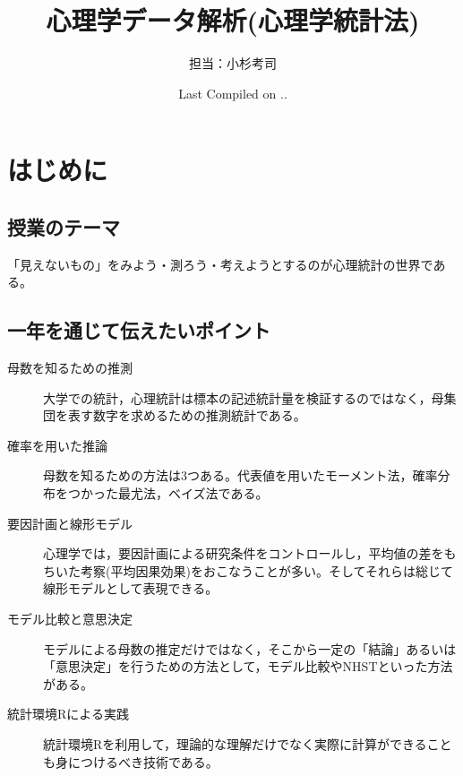 \documentclass[dvipsnames]{ltjsarticle}
\begin{document}
\title{心理学データ解析(心理学統計法)}
\author{担当：小杉考司}
\date{Last Compiled on \number\year .\number\month .\number\day}
\maketitle

\setcounter{tocdepth}{1}
\newpage
\section*{はじめに}
\subsection*{授業のテーマ}

「見えないもの」をみよう・測ろう・考えようとするのが心理統計の世界である。

\subsection*{一年を通じて伝えたいポイント}
\begin{description}
	\item[母数を知るための推測] 大学での統計，心理統計は標本の記述統計量を検証するのではなく，母集団を表す数字を求めるための推測統計である。
	\item[確率を用いた推論] 母数を知るための方法は3つある。代表値を用いたモーメント法，確率分布をつかった最尤法，ベイズ法である。
	\item[要因計画と線形モデル] 心理学では，要因計画による研究条件をコントロールし，平均値の差をもちいた考察(平均因果効果)をおこなうことが多い。そしてそれらは総じて線形モデルとして表現できる。
	\item[モデル比較と意思決定] モデルによる母数の推定だけではなく，そこから一定の「結論」あるいは「意思決定」を行うための方法として，モデル比較やNHSTといった方法がある。
	\item[統計環境Rによる実践] 統計環境Rを利用して，理論的な理解だけでなく実際に計算ができることも身につけるべき技術である。
\end{description}





















% 
% 
% 
% 
% 
% 
% 
% 
% 
% 


% 
% 
\printbibliography[title=引用文献]
\end{document}
